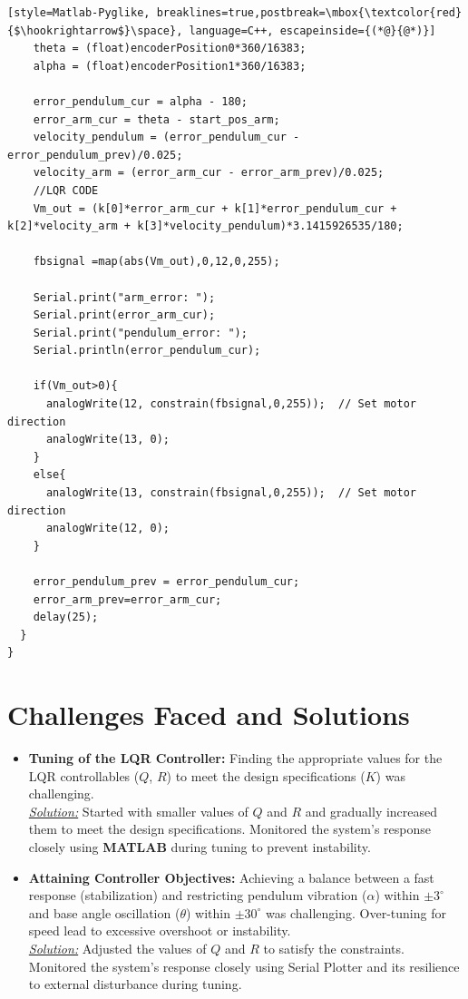 \documentclass{article}
\begin{document}
\begin{lstlisting}[style=Matlab-Pyglike, breaklines=true,postbreak=\mbox{\textcolor{red}{$\hookrightarrow$}\space}, language=C++, escapeinside={(*@}{@*)}]
    theta = (float)encoderPosition0*360/16383;
    alpha = (float)encoderPosition1*360/16383;
   
    error_pendulum_cur = alpha - 180;
    error_arm_cur = theta - start_pos_arm;
    velocity_pendulum = (error_pendulum_cur - error_pendulum_prev)/0.025;
    velocity_arm = (error_arm_cur - error_arm_prev)/0.025;
    //LQR CODE
    Vm_out = (k[0]*error_arm_cur + k[1]*error_pendulum_cur + k[2]*velocity_arm + k[3]*velocity_pendulum)*3.1415926535/180;
    
    fbsignal =map(abs(Vm_out),0,12,0,255);

    Serial.print("arm_error: ");
    Serial.print(error_arm_cur);
    Serial.print("pendulum_error: ");
    Serial.println(error_pendulum_cur);

    if(Vm_out>0){
      analogWrite(12, constrain(fbsignal,0,255));  // Set motor direction
      analogWrite(13, 0);
    }
    else{
      analogWrite(13, constrain(fbsignal,0,255));  // Set motor direction
      analogWrite(12, 0);
    }

    error_pendulum_prev = error_pendulum_cur;
    error_arm_prev=error_arm_cur;
    delay(25);
  }
}

\end{lstlisting}

\section{Challenges Faced and Solutions}
\begin{itemize}%
    \item \textbf{Tuning of the LQR Controller:} Finding the appropriate values for the LQR controllables ($Q$, $R$) to meet the design specifications ($K$) was challenging.\\
    \underline{\textit{Solution:}} Started with smaller values of $Q$ and $R$ and gradually increased them to meet the design specifications. Monitored the system's response closely using \textbf{MATLAB} during tuning to prevent instability.

    \item \textbf{Attaining Controller Objectives:} Achieving a balance between a fast response (stabilization) and restricting pendulum vibration ($\alpha$) within $\pm 3^{\circ}$ and base angle oscillation ($\theta$) within $\pm 30^{\circ}$ was challenging. Over-tuning for speed lead to excessive overshoot or instability.\\
    \underline{\textit{Solution:}} Adjusted the values of $Q$ and $R$ to satisfy the constraints. Monitored the system's response closely using Serial Plotter and its resilience to external disturbance during tuning.
\end{itemize}
\end{document}
